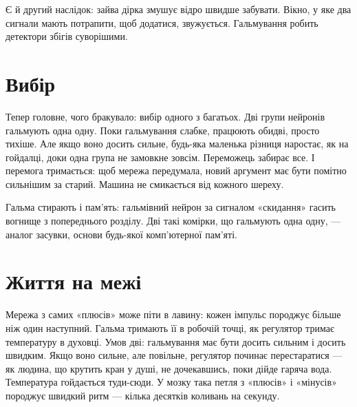 
Є й другий наслідок: зайва дірка змушує відро швидше забувати. Вікно, у яке два сигнали мають потрапити, щоб додатися, звужується. Гальмування робить детектори збігів суворішими.

\section*{Вибір}

Тепер головне, чого бракувало: вибір одного з багатьох. Дві групи нейронів гальмують одна одну. Поки гальмування слабке, працюють обидві, просто тихіше. Але якщо воно досить сильне, будь-яка маленька різниця наростає, як на гойдалці, доки одна група не замовкне зовсім. Переможець забирає все. І перемога тримається: щоб мережа передумала, новий аргумент має бути помітно сильнішим за старий. Машина не смикається від кожного шереху.

Гальма стирають і пам'ять: гальмівний нейрон за сигналом «скидання» гасить вогнище з попереднього розділу. Дві такі комірки, що гальмують одна одну, --- аналог засувки, основи будь-якої комп'ютерної пам'яті.

\section*{Життя на межі}

Мережа з самих «плюсів» може піти в лавину: кожен імпульс породжує більше ніж один наступний. Гальма тримають її в робочій точці, як регулятор тримає температуру в духовці. Умов дві: гальмування має бути досить сильним і досить швидким. Якщо воно сильне, але повільне, регулятор починає перестаратися --- як людина, що крутить кран у душі, не дочекавшись, поки дійде гаряча вода. Температура гойдається туди-сюди. У мозку така петля з «плюсів» і «мінусів» породжує швидкий ритм --- кілька десятків коливань на секунду.

